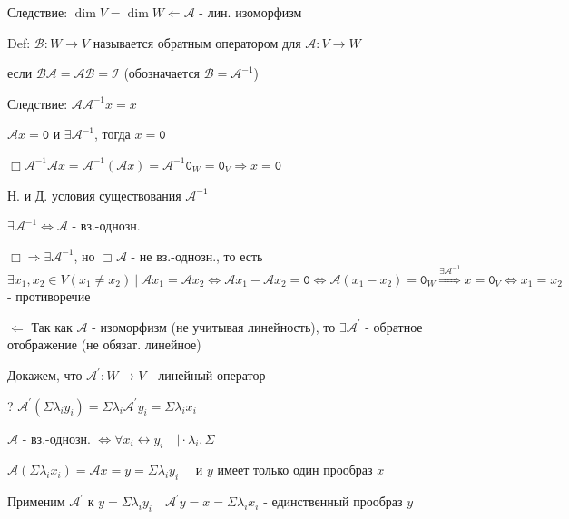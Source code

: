 \documentclass[12pt]{article}
\begin{document}
    Следствие: $\dim V = \dim W \Longleftarrow \mathcal{A}$ - лин. изоморфизм

    Def: $\mathcal{B} : W \rightarrow V$ называется обратным оператором для $\mathcal{A} : V \rightarrow W$

    если $\mathcal{B}\mathcal{A} = \mathcal{A}\mathcal{B} = \mathcal{I}$ (обозначается $\displaystyle \mathcal{B} = \mathcal{A}^{-1}$)

    Следствие: $\displaystyle \mathcal{A}\mathcal{A}^{-1} x = x$

    \Th $\mathcal{A}x = \texttt{0}$ и $\displaystyle \exists \mathcal{A}^{-1}$, тогда $x = \texttt{0}$

    $\displaystyle \Box \mathcal{A}^{-1}\mathcal{A} x = \mathcal{A}^{-1}(\mathcal{A} x) = \mathcal{A}^{-1} \texttt{0}_W = \texttt{0}_V \Longrightarrow x = \texttt{0}$

    \Th Н. и Д. условия существования $\displaystyle \mathcal{A}^{-1}$

    $\displaystyle \exists \mathcal{A}^{-1} \Longleftrightarrow \mathcal{A}$ - вз.-однозн.

    $\displaystyle \Box \Longrightarrow \exists \mathcal{A}^{-1}$, но $\sqsupset \mathcal{A}$ - не вз.-однозн., то есть
    $\displaystyle \exists x_1, x_2 \in V (x_1 \neq x_2) \ | \ \mathcal{A}x_1 = \mathcal{A}x_2 \Longleftrightarrow \mathcal{A}x_1 - \mathcal{A}x_2 = \texttt{0} \Longleftrightarrow
    \mathcal{A}(x_1 - x_2) = \texttt{0}_W \stackrel{\exists \mathcal{A}^{-1}}{\Longrightarrow} x = \texttt{0}_V \Longleftrightarrow x_1 = x_2$ - противоречие

    $\Longleftarrow$ Так как $\mathcal{A}$ - изоморфизм (не учитывая линейность), то $\displaystyle \exists \mathcal{A}^\prime$ - обратное отображение (не обязат. линейное)

    Докажем, что $\displaystyle \mathcal{A}^\prime : W \rightarrow V$ - линейный оператор

    ? $\displaystyle \mathcal{A}^\prime (\Sigma \lambda_i y_i) = \Sigma \lambda_i \mathcal{A}^\prime y_i = \Sigma \lambda_i x_i$

    $\mathcal{A}$ - вз.-однозн. $\displaystyle \Longleftrightarrow \forall x_i \longleftrightarrow y_i \quad \Big| \cdot \lambda_i, \Sigma$

    $\displaystyle \mathcal{A}(\Sigma \lambda_i x_i) = \mathcal{A} x = y = \Sigma \lambda_i y_i \quad$ и $y$ имеет только один прообраз $x$

    Применим $\displaystyle \mathcal{A}^\prime$ к $\displaystyle y = \Sigma \lambda_i y_i \quad \mathcal{A}^\prime y = x = \Sigma \lambda_i x_i$ - единственный прообраз $y$
\end{document}
